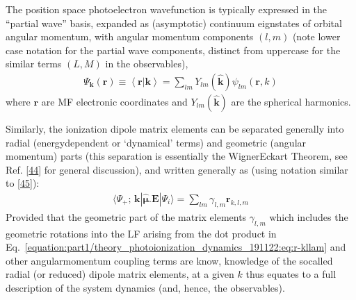 \documentclass[letterpaper,table,10pt,english]{jupyterBook}
\begin{document}
\sphinxAtStartPar
The position space photoelectron wavefunction is typically expressed in
the “partial wave” basis, expanded as (asymptotic) continuum
eignstates of orbital angular momentum, with angular momentum components
\((l,m)\) (note lower case notation for the partial wave components, distinct from upper\sphinxhyphen{}case for the similar terms \((L,M)\) in the observables),
\begin{equation}\label{equation:part1/theory_photoionization_dynamics_191122:eq:elwf}
\begin{split}\Psi_\mathbf{k}(\boldsymbol{r})\equiv\left<\boldsymbol{r}|\mathbf{k}\right> = \sum_{lm}Y_{lm}(\mathbf{\hat{k}})\psi_{lm}(\boldsymbol{r},k)
\end{split}
\end{equation}
\sphinxAtStartPar
where \(\boldsymbol{r}\) are MF electronic coordinates and
\(Y_{lm}(\mathbf{\hat{k}})\) are the spherical harmonics.

\sphinxAtStartPar
Similarly, the ionization dipole matrix elements can be separated
generally into radial (energy\sphinxhyphen{}dependent or ‘dynamical’ terms) and
geometric (angular momentum) parts (this separation is essentially the
Wigner\sphinxhyphen{}Eckart Theorem, see Ref. {[}\hyperlink{cite.backmatter/bibliography:id882}{44}{]} for general discussion),
and written generally as (using notation similar to {[}\hyperlink{cite.backmatter/bibliography:id750}{45}{]}):
\begin{equation}\label{equation:part1/theory_photoionization_dynamics_191122:eq:r-kllam}
\begin{split}\langle\Psi_{+};\,\mathbf{k}|\hat{\boldsymbol{\mu}}.\boldsymbol{\mathbf{E}}|\Psi_{i}\rangle = \sum_{lm}\gamma_{l,m}\mathbf{r}_{k,l,m}
\end{split}
\end{equation}
\sphinxAtStartPar
Provided that the geometric part of the matrix elements \(\gamma_{l,m}\) \sphinxhyphen{}
which includes the geometric rotations into the LF arising from the dot
product in Eq. \eqref{equation:part1/theory_photoionization_dynamics_191122:eq:r-kllam} and other angular\sphinxhyphen{}momentum coupling terms \sphinxhyphen{} are
know, knowledge of the so\sphinxhyphen{}called radial (or reduced) dipole matrix
elements, at a given \(k\) thus equates to a full description of the
system dynamics (and, hence, the observables).
\end{document}
